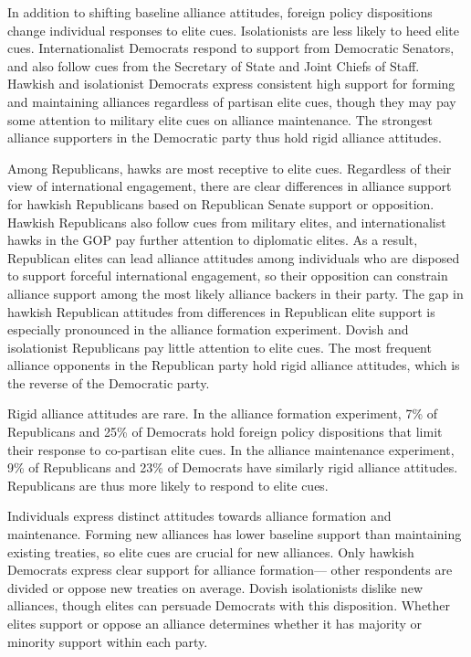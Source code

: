\documentclass[12pt]{article}
\begin{document}
In addition to shifting baseline alliance attitudes, foreign policy dispositions change individual responses to elite cues. 
Isolationists are less likely to heed elite cues. 
Internationalist Democrats respond to support from Democratic Senators, and also follow cues from the Secretary of State and Joint Chiefs of Staff. 
Hawkish and isolationist Democrats express consistent high support for forming and maintaining alliances regardless of partisan elite cues, though they may pay some attention to military elite cues on alliance maintenance. 
The strongest alliance supporters in the Democratic party thus hold rigid alliance attitudes.


Among Republicans, hawks are most receptive to elite cues. 
Regardless of their view of international engagement, there are clear differences in alliance support for hawkish Republicans based on Republican Senate support or opposition.
Hawkish Republicans also follow cues from military elites, and internationalist hawks in the GOP pay further attention to diplomatic elites. 
As a result, Republican elites can lead alliance attitudes among individuals who are disposed to support forceful international engagement, so their opposition can constrain alliance support among the most likely alliance backers in their party. 
The gap in hawkish Republican attitudes from differences in Republican elite support is especially pronounced in the alliance formation experiment. 
Dovish and isolationist Republicans pay little attention to elite cues. 
The most frequent alliance opponents in the Republican party hold rigid alliance attitudes, which is the reverse of the Democratic party. 


Rigid alliance attitudes are rare. 
In the alliance formation experiment, 7\% of Republicans and 25\% of Democrats hold foreign policy dispositions that limit their response to co-partisan elite cues. 
In the alliance maintenance experiment, 9\% of Republicans and 23\% of Democrats have similarly rigid alliance attitudes.
Republicans are thus more likely to respond to elite cues.


Individuals express distinct attitudes towards alliance formation and maintenance. 
Forming new alliances has lower baseline support than maintaining existing treaties, so elite cues are crucial for new alliances. 
Only hawkish Democrats express clear support for alliance formation--- other respondents are divided or oppose new treaties on average.
Dovish isolationists dislike new alliances, though elites can persuade Democrats with this disposition. 
Whether elites support or oppose an alliance determines whether it has majority or minority support within each party. 
\end{document}
